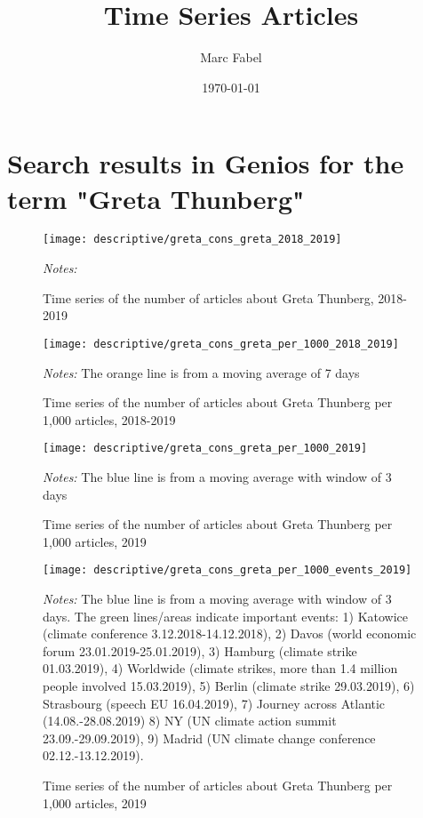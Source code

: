 \documentclass[11pt, a4paper]{article} %
\title{Time Series Articles}
\author{Marc Fabel}
\date{\monthyeardate\today}
\begin{document}
\section{Search results in Genios for the term "Greta Thunberg"}


\begin{figure}[H]\centering
	\caption{Time series of the number of articles about Greta Thunberg, 2018-2019}
	\texttt{[image: descriptive/greta\_cons\_greta\_2018\_2019]}
	\begin{minipage}{\linewidth}
		\scriptsize{\emph{Notes:} }
	\end{minipage}
\end{figure}
\begin{figure}[H]\centering
	\caption{Time series of the number of articles about Greta Thunberg per 1,000 articles, 2018-2019}
	\texttt{[image: descriptive/greta\_cons\_greta\_per\_1000\_2018\_2019]}
	\begin{minipage}{\linewidth}
		\scriptsize{\emph{Notes:} The orange line is from a moving average of 7 days}
	\end{minipage}
\end{figure}

\begin{figure}[H]\centering
	\caption{Time series of the number of articles about Greta Thunberg per 1,000 articles, 2019}
	\texttt{[image: descriptive/greta\_cons\_greta\_per\_1000\_2019]}
	\begin{minipage}{\linewidth}
		\scriptsize{\emph{Notes:} The blue line is from a moving average with window of 3 days}
	\end{minipage}
\end{figure}


\begin{figure}[H]\centering
	\caption{Time series of the number of articles about Greta Thunberg per 1,000 articles, 2019}
	\texttt{[image: descriptive/greta\_cons\_greta\_per\_1000\_events\_2019]}
	\begin{minipage}{\linewidth}
		\scriptsize{\emph{Notes:} The blue line is from a moving average with window of 3 days. The green lines/areas indicate important events: 1) Katowice (climate conference 3.12.2018-14.12.2018), 2) Davos (world economic forum 23.01.2019-25.01.2019), 3) Hamburg (climate strike 01.03.2019), 4) Worldwide (climate strikes, more than 1.4 million people involved 15.03.2019), 5) Berlin (climate strike 29.03.2019), 6) Strasbourg (speech EU 16.04.2019), 7) Journey across Atlantic (14.08.-28.08.2019) 8) NY (UN climate action summit 23.09.-29.09.2019), 9) Madrid (UN climate change conference 02.12.-13.12.2019).}
	\end{minipage}
\end{figure}
\end{document}
